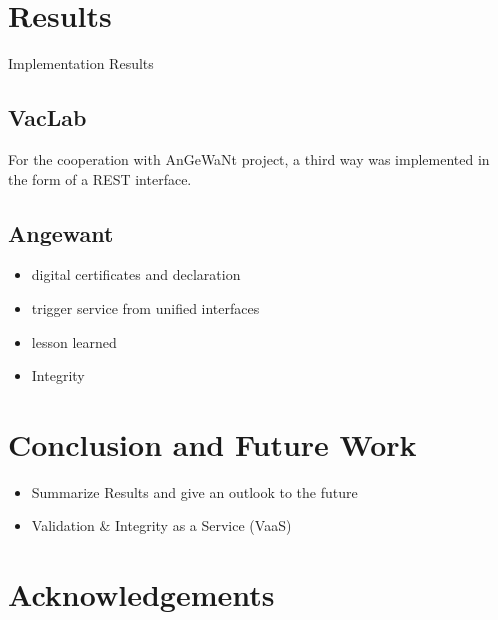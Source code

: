 \documentclass[3p,times,procedia]{elsarticle}
\begin{document}
\section{Results}
Implementation Results

\subsection{VacLab}


  For the cooperation with AnGeWaNt
  project, a third way was implemented in the form of a REST
  interface. 



\subsection{Angewant}
\begin{itemize}
    \item digital certificates and declaration %
    \item trigger service from unified interfaces %
    \item lesson learned %
    \item Integrity %
\end{itemize}


\section{Conclusion and Future Work}
\begin{itemize}
    \item Summarize Results and give an outlook to the future 
    \item Validation \& Integrity as a Service (VaaS)
\end{itemize}

\section*{Acknowledgements}
\end{document}
